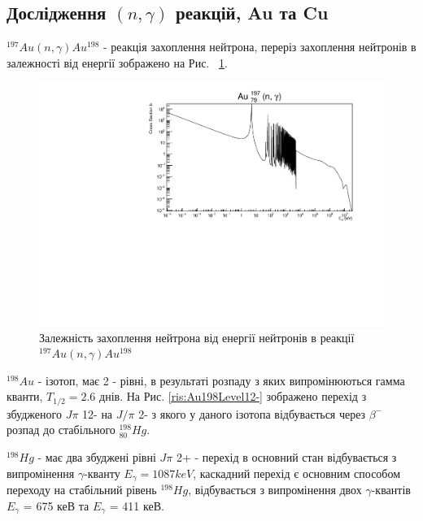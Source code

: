 \documentclass[a4paper, 14pt]{article}
\numberwithin{equation}{section}
\numberwithin{table}{section}
\begin{document}
\subsection{Дослідження $(n, \gamma)$ реакцій, Au та Cu} 
$^{197}Au(n,\gamma)Au^{198}$ - реакція захоплення нейтрона, переріз захоплення нейтронів в залежності від енергії зображено на Рис.~ \ref{ris:AuSigma}.
\begin{figure}[hbt!]
	\centering \includegraphics[width=1\textwidth]{sigma/Au197Sigma.pdf}
	\caption{Залежність захоплення нейтрона від енергії нейтронів в реакції  $^{197}Au(n,\gamma)Au^{198}$} 
	\label{ris:AuSigma}	
\end{figure} 

$^{198}Au $ - ізотоп, має 2 - рівні, в результаті розпаду з яких випромінюються гамма кванти, $T_{1/2} = 2.6$ днів. На Рис. \ref{ris:Au198Level12-} зображено перехід з збудженого $J\pi$ 12- на $J/\pi$ 2- з якого у даного ізотопа відбувається через $\beta^-$ розпад до стабільного $^{198}_{80}Hg$.

$^{198}Hg$ - має два збуджені рівні $J\pi$ 2+ - перехід в основний стан відбувається з випромінення $\gamma$-кванту $E_\gamma=1087keV$, каскадний перехід є основним способом переходу на стабільний рівень $^{198}Hg$, відбувається з випромінення двох $\gamma$-квантів $E_\gamma$ = 675 кеВ та $E_\gamma$ = 411 кеВ. 
\end{document}
